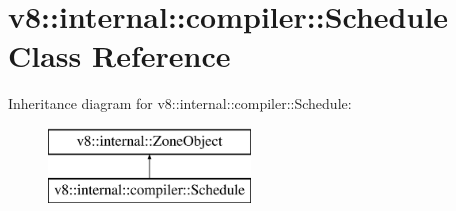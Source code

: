 \hypertarget{classv8_1_1internal_1_1compiler_1_1_schedule}{}\section{v8\+:\+:internal\+:\+:compiler\+:\+:Schedule Class Reference}
\label{classv8_1_1internal_1_1compiler_1_1_schedule}
Inheritance diagram for v8\+:\+:internal\+:\+:compiler\+:\+:Schedule\+:\begin{figure}[H]
\begin{center}
\leavevmode
\includegraphics[height=2.000000cm]{classv8_1_1internal_1_1compiler_1_1_schedule}
\end{center}
\end{figure}
